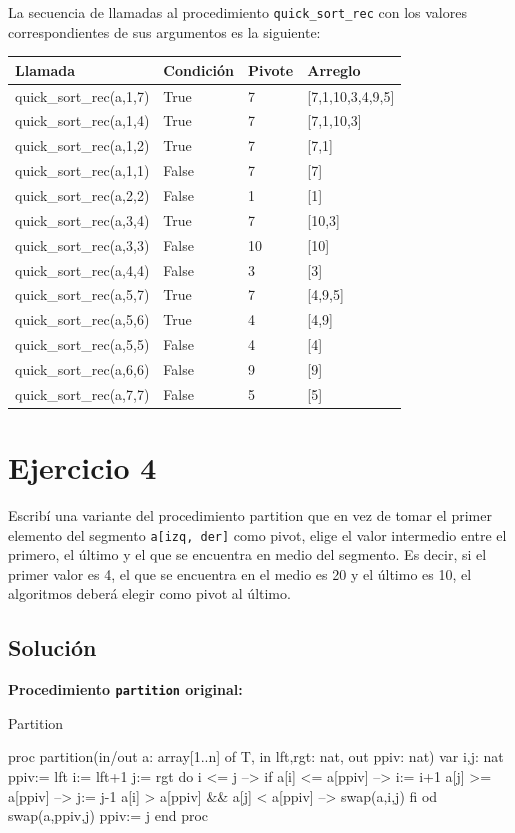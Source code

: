 La secuencia de llamadas al procedimiento \texttt{quick\_sort\_rec} con los valores correspondientes de sus argumentos es la siguiente:

\begin{tabularx}{\textwidth}{|X|X|X|X|}
  \hline
  \textbf{Llamada} & \textbf{Condición} & \textbf{Pivote} & \textbf{Arreglo} \\
  \hline
  quick\_sort\_rec(a,1,7) & True & 7 & [7,1,10,3,4,9,5] \\
  quick\_sort\_rec(a,1,4) & True & 7 & [7,1,10,3] \\
  quick\_sort\_rec(a,1,2) & True & 7 & [7,1] \\
  quick\_sort\_rec(a,1,1) & False & 7 & [7] \\
  quick\_sort\_rec(a,2,2) & False & 1 & [1] \\
  quick\_sort\_rec(a,3,4) & True & 7 & [10,3] \\
  quick\_sort\_rec(a,3,3) & False & 10 & [10] \\
  quick\_sort\_rec(a,4,4) & False & 3 & [3] \\
  quick\_sort\_rec(a,5,7) & True & 7 & [4,9,5] \\
  quick\_sort\_rec(a,5,6) & True & 4 & [4,9] \\
  quick\_sort\_rec(a,5,5) & False & 4 & [4] \\
  quick\_sort\_rec(a,6,6) & False & 9 & [9] \\
  quick\_sort\_rec(a,7,7) & False & 5 & [5] \\
  \hline
\end{tabularx}

\section{Ejercicio 4}
Escribí una variante del procedimiento partition que en vez de tomar el primer elemento del segmento \texttt{a[izq, der]} como pivot, elige el valor intermedio entre el primero, el último y el que se encuentra en medio del segmento. Es decir, si el primer valor es 4, el que se encuentra en el medio es 20 y el último es 10, el algoritmos deberá elegir como pivot al último.

\subsection{Solución}
\textbf{Procedimiento \texttt{partition} original:}

\begin{codebox}{Partition}
\begin{pascallike}
proc partition(in/out a: array[1..n] of T, in lft,rgt: nat, out ppiv: nat)
    var i,j: nat
    ppiv:= lft
    i:= lft+1
    j:= rgt
    do i <= j --> if a[i] <= a[ppiv] --> i:= i+1
                    a[j] >= a[ppiv] --> j:= j-1
                    a[i] > a[ppiv] && a[j] < a[ppiv] --> swap(a,i,j)
                fi
    od
    swap(a,ppiv,j)
    ppiv:= j
end proc
\end{pascallike}
\end{codebox}

